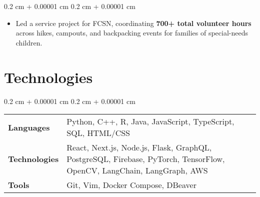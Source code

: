 \documentclass[10pt, letterpaper]{article}
\newenvironment{highlights}{
    \begin{itemize}[
        topsep=0.10 cm,
        parsep=0.10 cm,
        partopsep=0pt,
        itemsep=0pt,
        leftmargin=0.4 cm + 10pt
    ]
}{
    \end{itemize}
} %
\newenvironment{onecolentry}{
    \begin{adjustwidth}{
        0.2 cm + 0.00001 cm
    }{
        0.2 cm + 0.00001 cm
    }
}{
    \end{adjustwidth}
} %
\begin{document}
        \vspace{0.10 cm}
        \begin{onecolentry}
            \begin{highlights}
                \item Led a service project for FCSN, coordinating \textbf{700+ total volunteer hours} across hikes, campouts, and backpacking events for families of special-needs children.
            \end{highlights}
        \end{onecolentry}


    \section{Technologies}
    
        \begin{onecolentry}
            \begin{tabularx}{\textwidth}{@{}p{2.15cm}Y@{}}
                \textbf{Languages} & Python, C++, R, Java, JavaScript, TypeScript, SQL, HTML/CSS \\[0.1cm]
                \textbf{Technologies} & React, Next.js, Node.js, Flask, GraphQL, PostgreSQL, Firebase, PyTorch, TensorFlow, OpenCV, LangChain, LangGraph, AWS \\[0.5cm]
                \textbf{Tools} & Git, Vim, Docker Compose, DBeaver
            \end{tabularx}
        \end{onecolentry}
\end{document}
